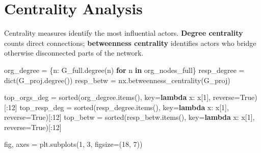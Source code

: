 \documentclass[
  letterpaper,
  DIV=11,
  numbers=noendperiod]{scrartcl}
\newenvironment{Shaded}{\begin{snugshade}}{\end{snugshade}}
\newcommand{\BuiltInTok}[1]{\textcolor[rgb]{0.00,0.23,0.31}{#1}}
\newcommand{\ControlFlowTok}[1]{\textcolor[rgb]{0.00,0.23,0.31}{\textbf{#1}}}
\newcommand{\DecValTok}[1]{\textcolor[rgb]{0.68,0.00,0.00}{#1}}
\newcommand{\KeywordTok}[1]{\textcolor[rgb]{0.00,0.23,0.31}{\textbf{#1}}}
\newcommand{\NormalTok}[1]{\textcolor[rgb]{0.00,0.23,0.31}{#1}}
\newcommand{\OperatorTok}[1]{\textcolor[rgb]{0.37,0.37,0.37}{#1}}
\newcommand{\VariableTok}[1]{\textcolor[rgb]{0.07,0.07,0.07}{#1}}
\begin{document}
\section{Centrality Analysis}\label{centrality-analysis}

Centrality measures identify the most influential actors. \textbf{Degree
centrality} counts direct connections; \textbf{betweenness centrality}
identifies actors who bridge otherwise disconnected parts of the
network.

\begin{Shaded}
\begin{Highlighting}[]
\NormalTok{org\_degree }\OperatorTok{=}\NormalTok{ \{n: G\_full.degree(n) }\ControlFlowTok{for}\NormalTok{ n }\KeywordTok{in}\NormalTok{ org\_nodes\_full\}}
\NormalTok{resp\_degree }\OperatorTok{=} \BuiltInTok{dict}\NormalTok{(G\_proj.degree())}
\NormalTok{resp\_betw }\OperatorTok{=}\NormalTok{ nx.betweenness\_centrality(G\_proj)}

\NormalTok{top\_orgs\_deg }\OperatorTok{=} \BuiltInTok{sorted}\NormalTok{(org\_degree.items(), key}\OperatorTok{=}\KeywordTok{lambda}\NormalTok{ x: x[}\DecValTok{1}\NormalTok{],}
\NormalTok{                      reverse}\OperatorTok{=}\VariableTok{True}\NormalTok{)[:}\DecValTok{12}\NormalTok{]}
\NormalTok{top\_resp\_deg }\OperatorTok{=} \BuiltInTok{sorted}\NormalTok{(resp\_degree.items(), key}\OperatorTok{=}\KeywordTok{lambda}\NormalTok{ x: x[}\DecValTok{1}\NormalTok{],}
\NormalTok{                      reverse}\OperatorTok{=}\VariableTok{True}\NormalTok{)[:}\DecValTok{12}\NormalTok{]}
\NormalTok{top\_betw }\OperatorTok{=} \BuiltInTok{sorted}\NormalTok{(resp\_betw.items(), key}\OperatorTok{=}\KeywordTok{lambda}\NormalTok{ x: x[}\DecValTok{1}\NormalTok{],}
\NormalTok{                  reverse}\OperatorTok{=}\VariableTok{True}\NormalTok{)[:}\DecValTok{12}\NormalTok{]}

\NormalTok{fig, axes }\OperatorTok{=}\NormalTok{ plt.subplots(}\DecValTok{1}\NormalTok{, }\DecValTok{3}\NormalTok{, figsize}\OperatorTok{=}\NormalTok{(}\DecValTok{18}\NormalTok{, }\DecValTok{7}\NormalTok{))}


\end{Highlighting}
\end{Shaded}
\end{document}
